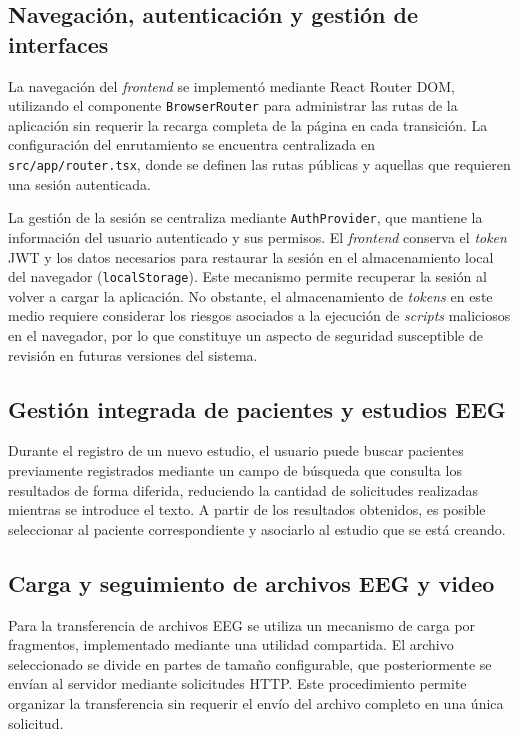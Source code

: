 \subsection{Navegación, autenticación y gestión de interfaces}

La navegación del \textit{frontend} se implementó mediante
React Router DOM, utilizando el componente
\texttt{BrowserRouter} para administrar las rutas
de la aplicación sin requerir la recarga completa
de la página en cada transición. La configuración
del enrutamiento se encuentra centralizada en
\texttt{src/app/router.tsx}, donde se definen
las rutas públicas y aquellas que requieren
una sesión autenticada.

La gestión de la sesión se centraliza mediante
\texttt{AuthProvider}, que mantiene la información
del usuario autenticado y sus permisos. El \textit{frontend}
conserva el \textit{token} JWT y los datos necesarios para
restaurar la sesión en el almacenamiento local del
navegador (\texttt{localStorage}). Este mecanismo
permite recuperar la sesión al volver a cargar la
aplicación. No obstante, el almacenamiento de \textit{tokens}
en este medio requiere considerar los riesgos asociados
a la ejecución de \textit{scripts} maliciosos en el navegador,
por lo que constituye un aspecto de seguridad
susceptible de revisión en futuras versiones del sistema.

\subsection{Gestión integrada de pacientes y estudios EEG}

Durante el registro de un nuevo estudio,
el usuario puede buscar pacientes previamente
registrados mediante un campo de búsqueda
que consulta los resultados de forma diferida,
reduciendo la cantidad de solicitudes realizadas
mientras se introduce el texto. A partir de
los resultados obtenidos, es posible seleccionar
al paciente correspondiente y asociarlo al
estudio que se está creando.

\subsection{Carga y seguimiento de archivos EEG y video}

Para la transferencia de archivos EEG se
utiliza un mecanismo de carga por fragmentos,
implementado mediante una utilidad compartida.
El archivo seleccionado se divide en partes
de tamaño configurable, que posteriormente
se envían al servidor mediante solicitudes
HTTP. Este procedimiento permite organizar
la transferencia sin requerir el envío
del archivo completo en una única solicitud.

